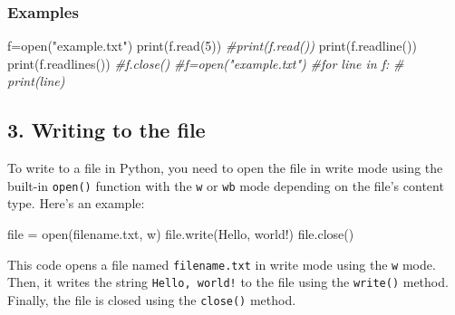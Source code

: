 \documentclass[11pt]{article}
\newenvironment{Shaded}{}{}
\newcommand{\DecValTok}[1]{\textcolor[rgb]{0.25,0.63,0.44}{{#1}}}
\newcommand{\StringTok}[1]{\textcolor[rgb]{0.25,0.44,0.63}{{#1}}}
\newcommand{\CommentTok}[1]{\textcolor[rgb]{0.38,0.63,0.69}{\textit{{#1}}}}
\newcommand{\NormalTok}[1]{{#1}}
\newcommand{\OperatorTok}[1]{\textcolor[rgb]{0.40,0.40,0.40}{{#1}}}
\newcommand{\BuiltInTok}[1]{{#1}}
\begin{document}
\hypertarget{examples-1}{%
\subsubsection{Examples}\label{examples-1}}

\begin{Shaded}
\begin{Highlighting}[]
\NormalTok{f}\OperatorTok{=}\BuiltInTok{open}\NormalTok{(}\StringTok{"example.txt"}\NormalTok{)}
\BuiltInTok{print}\NormalTok{(f.read(}\DecValTok{5}\NormalTok{))}
\CommentTok{\#print(f.read())}
\BuiltInTok{print}\NormalTok{(f.readline())}
\BuiltInTok{print}\NormalTok{(f.readlines())}
\CommentTok{\#f.close()}
\CommentTok{\#f=open("example.txt")}
\CommentTok{\#for line in f:}
\CommentTok{\#        print(line)}
\end{Highlighting}
\end{Shaded}

\hypertarget{writing-to-the-uxfb01le}{%
\subsection{3. Writing to the ﬁle}\label{writing-to-the-uxfb01le}}

To write to a file in Python, you need to open the file in write mode
using the built-in \texttt{open()} function with the
\texttt{\textquotesingle{}w\textquotesingle{}} or
\texttt{\textquotesingle{}wb\textquotesingle{}} mode depending on the
file's content type. Here's an example:

\begin{Shaded}
\begin{Highlighting}[]
\BuiltInTok{file} \OperatorTok{=} \BuiltInTok{open}\NormalTok{(}\StringTok{\textquotesingle{}filename.txt\textquotesingle{}}\NormalTok{, }\StringTok{\textquotesingle{}w\textquotesingle{}}\NormalTok{)}
\BuiltInTok{file}\NormalTok{.write(}\StringTok{\textquotesingle{}Hello, world!\textquotesingle{}}\NormalTok{)}
\BuiltInTok{file}\NormalTok{.close()}
\end{Highlighting}
\end{Shaded}

This code opens a file named
\texttt{\textquotesingle{}filename.txt\textquotesingle{}} in write mode
using the \texttt{\textquotesingle{}w\textquotesingle{}} mode. Then, it
writes the string
\texttt{\textquotesingle{}Hello,\ world!\textquotesingle{}} to the file
using the \texttt{write()} method. Finally, the file is closed using the
\texttt{close()} method.
\end{document}
